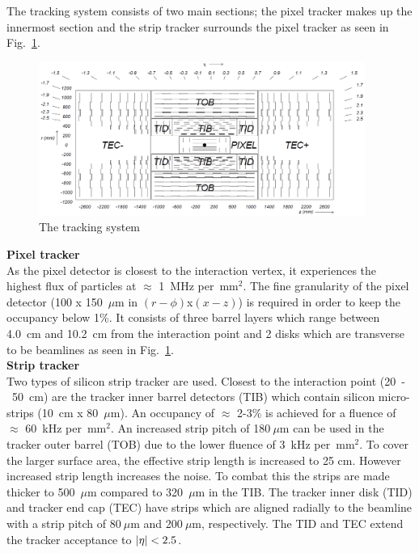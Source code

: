 The tracking system consists of two main sections; the pixel tracker makes up the innermost section and the strip tracker surrounds the pixel tracker as seen in Fig.~\ref{fig:TrackerWhole}. 

\begin{figure}[ht!]
\centering
    \includegraphics[width=0.95\textwidth]{images/TrackerWhole.png}
    \caption{The tracking system~\cite{1748-0221-3-08-S08004}}
    \label{fig:TrackerWhole}
\end{figure}

\textbf{Pixel tracker}\\
As the pixel detector is closest to the interaction vertex, it experiences the highest flux of particles at $\approx$ 1~MHz per~mm$^{2}$. The fine granularity of the pixel detector (100 x 150~$\mu$m in $(r-\phi)$x$(x-z)$) is required in order to keep the occupancy below 1\%. It consists of three barrel layers which range between 4.0~cm and 10.2~cm from the interaction point and 2 disks which are transverse to be beamlines as seen in Fig.~\ref{fig:TrackerWhole}.\\

\textbf{Strip tracker}\\
Two types of silicon strip tracker are used. Closest to the interaction point (20~-~50~cm) are the tracker inner barrel detectors (TIB) which contain silicon micro-strips (10~cm x 80~$\mu$m). An occupancy of $\approx$ 2-3\% is achieved for a fluence of $\approx$ 60~kHz per~mm$^{2}$.
An increased strip pitch of 180$~\mu$m can be used in the tracker outer barrel (TOB) due to the lower fluence of 3~kHz per~mm$^{2}$. To cover the larger surface area, the effective strip length is increased to 25 cm. However increased strip length increases the noise. To combat this the strips are made thicker to 500~$\mu$m compared to 320~$\mu$m in the TIB.
The tracker inner disk (TID) and tracker end cap (TEC) have strips which are aligned radially to the beamline with a strip pitch of 80$~\mu$m and 200$~\mu$m, respectively. The TID and TEC extend the tracker acceptance to $\lvert \eta \rvert<2.5$.

